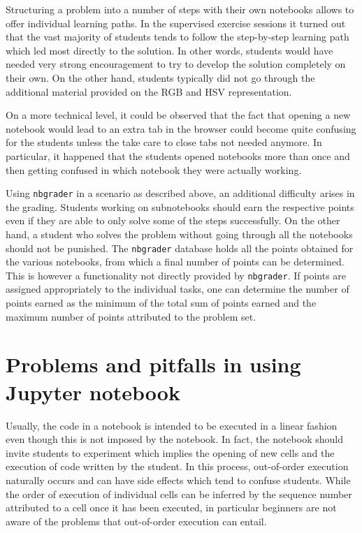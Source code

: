 \documentclass[twocolumn]{svjour3}          %
\begin{document}
Structuring a problem into a number of steps with their own notebooks allows to
offer individual learning paths. In the supervised exercise sessions it turned
out that the vast majority of students tends to follow the step-by-step
learning path which led most directly to the solution. In other words, students
would have needed very strong encouragement to try to develop the solution
completely on their own. On the other hand, students typically did not go through
the additional material provided on the RGB and HSV representation.

On a more technical level, it could be observed that the fact that opening a
new notebook would lead to an extra tab in the browser could become quite
confusing for the students unless the take care to close tabs not needed
anymore. In particular, it happened that the students opened notebooks more
than once and then getting confused in which notebook they were actually
working.

Using \texttt{nbgrader} in a scenario as described above, an additional
difficulty arises in the grading. Students working on subnotebooks should earn
the respective points even if they are able to only solve some of the steps
successfully. On the other hand, a student who solves the problem without going
through all the notebooks should not be punished. The \texttt{nbgrader}
database holds all the points obtained for the various notebooks, from which a
final number of points can be determined. This is however a functionality not
directly provided by \texttt{nbgrader}. If points are assigned appropriately to
the individual tasks, one can determine the number of points earned as the
minimum of the total sum of points earned and the maximum number of points
attributed to the problem set.


\section{Problems and pitfalls in using Jupyter notebook}
Usually, the code in a notebook is intended to be executed in a linear fashion even
though this is not imposed by the notebook. In fact, the notebook
should invite students to experiment which implies the opening of new
cells and the execution of code written by the student. In this
process, out-of-order execution naturally occurs and can have side
effects which tend to confuse students. While the order of execution
of individual cells can be inferred by the sequence number attributed
to a cell once it has been executed, in particular beginners are not
aware of the problems that out-of-order execution can entail.
\end{document}
